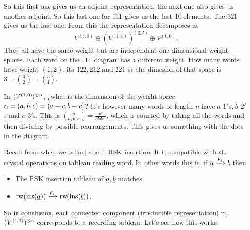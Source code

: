 \documentclass[12pt]{memoir}
\begin{document}
\begin{Ex}
\begin{figure}

    \end{figure}
    So this first one gives us an adjoint representation, the next one also gives us another adjoint. So this last one for $111$ gives us the last 10 elements. The $321$ gives us the last one. From this the representation decomposes as
    $$V^{(3,0)}\oplus(V^{(2,1)})^(\oplus 2)\oplus V^{(0,0)}.$$
    They all have the same weight but are independent one-dimensional weight spaces. Each word on the $111$ diagram has a different weight. How many words have weight $(1,2)$, its $122,212$ and $221$ so the dimesion of that space is $3=\binom{3}{2}=\binom{3}{1}$. 
\end{Ex}

\begin{Qn}
In $(V^{(1,0)})^{\otimes n}$, ¿what is the dimension of the weight space $\alpha=(a,b,c)=(a-c,b-c)$? It's however many words of length $n$ have $a$ $1'$s, $b$ $2'$s and $c$ $3'$s. This is $\binom{n}{a,b,c}=\frac{n!}{a!b!c!}$, which is counted by taking all the words and then dividing by possible rearrangements. This gives us something with the dots in the diagram. 
\end{Qn}

Recall from when we talked about RSK insertion: It is compatible with $\mathfrak{sl}_2$ crystal operations on tableau reading word. In other words this is, if $\underline a\xrightarrow{F_i}\underline{b}$ then 
\begin{itemize}
    \item The RSK insertion tableau of $\underline a,\underline b$ matches.
    \item $\operatorname{rw}(\operatorname{ins}(\underline a))\xrightarrow{F_i}\operatorname{rw}(\operatorname{ins}(\underline b))$.
\end{itemize}

So in conclusion, each connected component (irreducible representation) in $(V^{(1,0)})^{\otimes n}$ corresponds to a recording tableau. Let's see how this works: 
\end{document}

